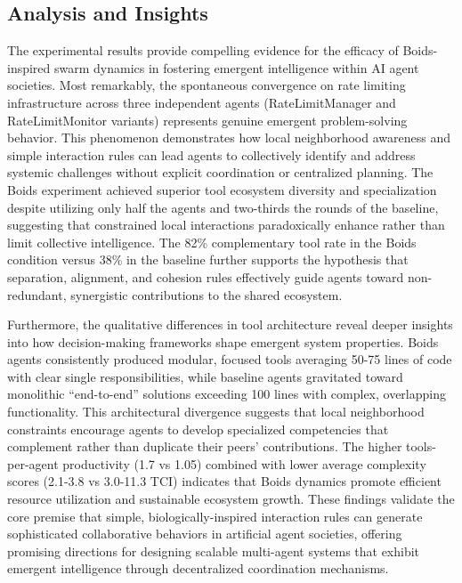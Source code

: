 \documentclass{article}
\begin{document}
\subsection{Analysis and Insights}

The experimental results provide compelling evidence for the efficacy of Boids-inspired swarm dynamics in fostering emergent intelligence within AI agent societies. Most remarkably, the spontaneous convergence on rate limiting infrastructure across three independent agents (RateLimitManager and RateLimitMonitor variants) represents genuine emergent problem-solving behavior. This phenomenon demonstrates how local neighborhood awareness and simple interaction rules can lead agents to collectively identify and address systemic challenges without explicit coordination or centralized planning. The Boids experiment achieved superior tool ecosystem diversity and specialization despite utilizing only half the agents and two-thirds the rounds of the baseline, suggesting that constrained local interactions paradoxically enhance rather than limit collective intelligence. The 82\% complementary tool rate in the Boids condition versus 38\% in the baseline further supports the hypothesis that separation, alignment, and cohesion rules effectively guide agents toward non-redundant, synergistic contributions to the shared ecosystem.

Furthermore, the qualitative differences in tool architecture reveal deeper insights into how decision-making frameworks shape emergent system properties. Boids agents consistently produced modular, focused tools averaging 50-75 lines of code with clear single responsibilities, while baseline agents gravitated toward monolithic ``end-to-end'' solutions exceeding 100 lines with complex, overlapping functionality. This architectural divergence suggests that local neighborhood constraints encourage agents to develop specialized competencies that complement rather than duplicate their peers' contributions. The higher tools-per-agent productivity (1.7 vs 1.05) combined with lower average complexity scores (2.1-3.8 vs 3.0-11.3 TCI) indicates that Boids dynamics promote efficient resource utilization and sustainable ecosystem growth. These findings validate the core premise that simple, biologically-inspired interaction rules can generate sophisticated collaborative behaviors in artificial agent societies, offering promising directions for designing scalable multi-agent systems that exhibit emergent intelligence through decentralized coordination mechanisms.
\end{document}
